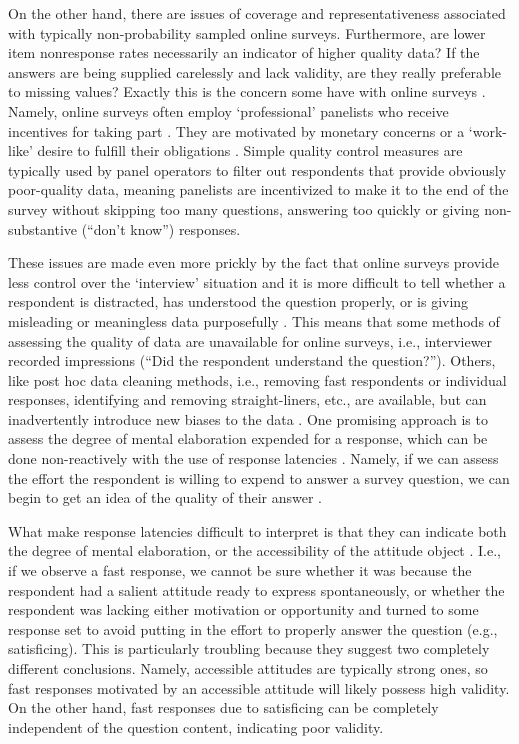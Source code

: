 \documentclass[Royal,times,sageh]{sagej}
\begin{document}
On the other hand, there are issues of coverage and representativeness
associated with typically non-probability sampled online surveys.
Furthermore, are lower item nonresponse rates necessarily an indicator
of higher quality data? If the answers are being supplied carelessly and
lack validity, are they really preferable to missing values? Exactly
this is the concern some have with online surveys
\citep{Leiner2019, Kaminska2010, Vannette2014}. Namely, online surveys
often employ `professional' panelists who receive incentives for taking
part \citep{Stocke2006}. They are motivated by monetary concerns or a
`work-like' desire to fulfill their obligations \citep{Silber2013}.
Simple quality control measures are typically used by panel operators to
filter out respondents that provide obviously poor-quality data, meaning
panelists are incentivized to make it to the end of the survey without
skipping too many questions, answering too quickly \citep[`clicking
through',][]{Leiner2019} or giving non-substantive (``don't know'')
responses.

These issues are made even more prickly by the fact that online surveys
provide less control over the `interview' situation and it is more
difficult to tell whether a respondent is distracted, has understood the
question properly, or is giving misleading or meaningless data
purposefully \citep{Leiner2019, Wolter2019}. This means that some
methods of assessing the quality of data are unavailable for online
surveys, i.e., interviewer recorded impressions (``Did the respondent
understand the question?''). Others, like post hoc data cleaning
methods, i.e., removing fast respondents or individual responses,
identifying and removing straight-liners, etc., are available, but can
inadvertently introduce new biases to the data \citep{Leiner2019}. One
promising approach is to assess the degree of mental elaboration
expended for a response, which can be done non-reactively with the use
of response latencies \citep[reactive methods may try to directly assess
the respondent's motivation and opportunity by asking directly about
them,][]{Mayerl2008, Stocke2006}. Namely, if we can assess the effort
the respondent is willing to expend to answer a survey question, we can
begin to get an idea of the quality of their answer \citep[
p.~9]{Lenzner2011}.

What make response latencies difficult to interpret is that they can
indicate both the degree of mental elaboration, or the accessibility of
the attitude object
\citep{Stocke2004c, Andersen2017, Andersen2019b, Mayerl2019}. I.e., if
we observe a fast response, we cannot be sure whether it was because the
respondent had a salient attitude ready to express spontaneously, or
whether the respondent was lacking either motivation or opportunity and
turned to some response set to avoid putting in the effort to properly
answer the question (e.g., satisficing). This is particularly troubling
because they suggest two completely different conclusions. Namely,
accessible attitudes are typically strong ones, so fast responses
motivated by an accessible attitude will likely possess high validity.
On the other hand, fast responses due to satisficing can be completely
independent of the question content, indicating poor validity.
\end{document}

